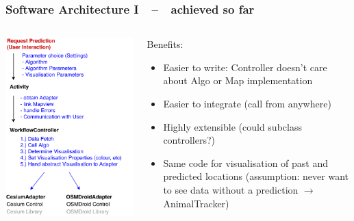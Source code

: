 \documentclass[xcolor=dvipsnames]{beamer}
\begin{document}
\begin{frame}
	\frametitle{\textbf{Software Architecture I}~~--~~achieved so far}
	\begin{columns}
	\begin{column}{0.5\textwidth}
		\includegraphics[width=\textwidth]{diagrams/controller-flow.pdf}
	\end{column}
	\begin{column}{0.5\textwidth}
		\fontsize{9pt}{9}\selectfont
		Benefits:
		\begin{itemize}
		 	 \item Easier to write: Controller doesn't care about Algo or Map implementation
		 	 \item Easier to integrate (call from anywhere)
		 	 \item Highly extensible (could subclass controllers?)
		 	 \item Same code for visualisation of past and predicted locations {\tiny(assumption: never want to see data without a prediction $\rightarrow$ AnimalTracker)}
		\end{itemize}
 	\end{column}
	\end{columns}
\end{frame}
\end{document}
